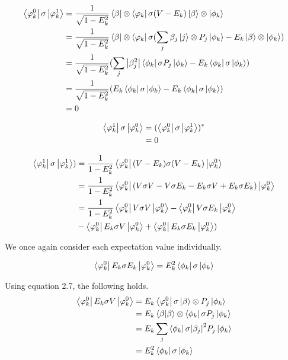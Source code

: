 \begin{align} \begin{split}
  \bra{\varphi_k^0} \sigma \ket{\varphi_k^1} &=
  \frac{1}{\sqrt{1-E_k^2}} \bra{\beta} \otimes \bra{\varphi_k} \sigma (V - E_k) \ket{\beta} \otimes \ket{\phi_k}\\
  &=\frac{1}{\sqrt{1-E_k^2}} \bra{\beta} \otimes \bra{\varphi_k} \sigma ( \sum_j\beta_j \ket{j} \otimes P_j \ket{\phi_k} - E_k \ket{\beta} \otimes \ket{\phi_k})\\
  &= \frac{1}{\sqrt{1-E_k^2}}(\sum_j \abs{\beta_j^2} \bra{\phi_k} \sigma P_j\ket{\phi_k} - E_k \bra{\phi_k} \sigma \ket{\phi_k})\\
  &= \frac{1}{\sqrt{1-E_k^2}}( E_k \bra{\phi_k} \sigma \ket{\phi_k} - E_k \bra{\phi_k} \sigma \ket{\phi_k})\\
  &= 0
\end{split} \end{align}

\begin{align} \begin{split}
  \bra{\varphi_k^1} \sigma \ket{\varphi_k^0} &= (\bra{\varphi_k^0} \sigma \ket{\varphi_k^1})^*\\
  &= 0
\end{split} \end{align}

\begin{align} \begin{split}
  \bra{\varphi_k^1} \sigma \ket{\varphi_k^1}) &=
  \frac{1}{1-E_k^2} \bra{\varphi_k^0} (V-E_k) \sigma (V-E_k) \ket{\varphi_k^0}\\
  &= \frac{1}{1-E_k^2} \bra{\varphi_k^0} (V \sigma V - V\sigma E_k - E_k \sigma V + E_k \sigma E_k )\ket{\varphi_k^0}\\
  &= \frac{1}{1-E_k^2} \bra{\varphi_k^0} V \sigma V \ket{\varphi_k^0} - \bra{\varphi_k^0} V\sigma E_k \ket{\varphi_k^0}\\
    &- \bra{\varphi_k^0} E_k \sigma V \ket{\varphi_k^0} + \bra{\varphi_k^0} E_k \sigma E_k \ket{\varphi_k^0})
\end{split} \end{align}

We once again consider each expectation value individually.

$$ \bra{\varphi_k^0} E_k \sigma E_k \ket{\varphi_k^0} = E_k^2 \bra{\phi_k} \sigma \ket{\phi_k} $$

Using equation 2.7, the following holds. 
\begin{align} \begin{split}
\bra{\varphi_k^0} E_k \sigma V \ket{\varphi_k^0} &=  E_k\bra{\varphi_k^0} \sigma \ket{\beta} \otimes P_j \ket{\phi_k}\\
&= E_k \braket{\beta}{\beta} \otimes \bra{\phi_k} \sigma P_j \ket{\phi_k}\\
&= E_k \sum_j \bra{\phi_k} \sigma \abs{\beta_j}^2 P_j \ket{\phi_k}\\
&= E_k^2 \bra{\phi_k} \sigma \ket{\phi_k}
\end{split} \end{align}

